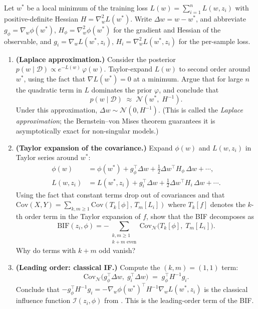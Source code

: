 \documentclass[11pt]{article}
\begin{document}
\begin{exercise}\label{ex:bif-expansion}
Let $w^*$ be a local minimum of the training loss $L(w) = \sum_{i=1}^n L(w,z_i)$ with positive-definite Hessian $H = \nabla_w^2 L(w^*)$. Write $\Delta w = w - w^*$, and abbreviate $g_\phi = \nabla_w\phi(w^*)$, $H_\phi = \nabla_w^2\phi(w^*)$ for the gradient and Hessian of the observable, and $g_i = \nabla_w L(w^*,z_i)$, $H_i = \nabla_w^2 L(w^*,z_i)$ for the per-sample loss.
\begin{enumerate}
  \item \textbf{(Laplace approximation.)} Consider the posterior $p(w\mid\mathcal{D}) \propto e^{-L(w)}\,\varphi(w)$. Taylor-expand $L(w)$ to second order around $w^*$, using the fact that $\nabla L(w^*) = 0$ at a minimum. Argue that for large $n$ the quadratic term in $L$ dominates the prior $\varphi$, and conclude that
  \[
    p(w\mid\mathcal{D}) \;\approx\; \mathcal{N}(w^*,\;H^{-1}).
  \]
  Under this approximation, $\Delta w \sim \mathcal{N}(0, H^{-1})$. (This is called the \emph{Laplace approximation}; the Bernstein--von Mises theorem guarantees it is asymptotically exact for non-singular models.)

  \item \textbf{(Taylor expansion of the covariance.)} Expand $\phi(w)$ and $L(w,z_i)$ in Taylor series around $w^*$:
  \begin{align*}
    \phi(w) &= \phi(w^*) + g_\phi^\top\Delta w + \tfrac{1}{2}\Delta w^\top H_\phi\,\Delta w + \cdots, \\
    L(w,z_i) &= L(w^*,z_i) + g_i^\top\Delta w + \tfrac{1}{2}\Delta w^\top H_i\,\Delta w + \cdots.
  \end{align*}
  Using the fact that constant terms drop out of covariances and that $\mathrm{Cov}(X,Y) = \sum_{k,m\ge 1}\mathrm{Cov}(T_k[\phi],\,T_m[L_i])$ where $T_k[f]$ denotes the $k$-th order term in the Taylor expansion of $f$, show that the BIF decomposes as
  \[
    \mathrm{BIF}(z_i,\phi) = -\sum_{\substack{k,m\ge 1\\k+m\text{ even}}} \mathrm{Cov}_{\mathcal{N}}\bigl(T_k[\phi],\;T_m[L_i]\bigr).
  \]
  Why do terms with $k+m$ odd vanish?

  \item \textbf{(Leading order: classical IF.)} Compute the $(k,m) = (1,1)$ term:
  \[
    \mathrm{Cov}_{\mathcal{N}}\bigl(g_\phi^\top\Delta w,\;g_i^\top\Delta w\bigr) \;=\; g_\phi^\top H^{-1} g_i.
  \]
  Conclude that $-g_\phi^\top H^{-1}g_i = -\nabla_w\phi(w^*)^\top H^{-1}\nabla_w L(w^*,z_i)$ is the classical influence function $\mathcal{I}(z_i,\phi)$ from . This is the leading-order term of the BIF.


\end{enumerate}
\end{exercise}
\end{document}
